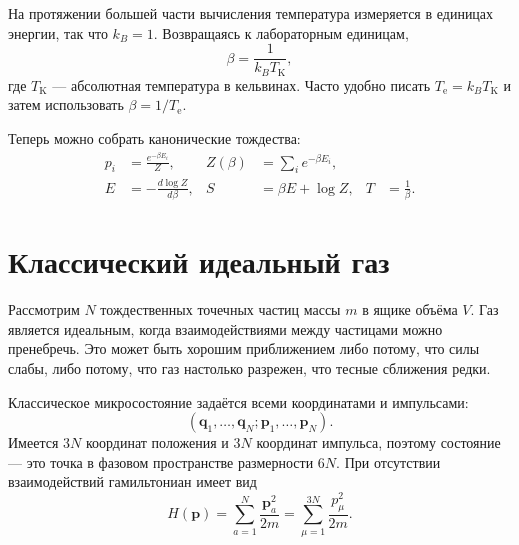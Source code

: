 На протяжении большей части вычисления температура измеряется в единицах энергии, так что \(k_B=1\). Возвращаясь к лабораторным единицам,
\begin{equation}
 \beta=\frac{1}{k_B T_{\mathrm K}},
 \label{eq:sm4-beta-laboratory}
\end{equation}
где \(T_{\mathrm K}\) — абсолютная температура в кельвинах. Часто удобно писать \(T_{\mathrm e}=k_BT_{\mathrm K}\) и затем использовать \(\beta=1/T_{\mathrm e}\).

\begin{classroomqa}
\end{classroomqa}

Теперь можно собрать канонические тождества:
\begin{align}
 p_i&=\frac{e^{-\beta E_i}}{Z},&
 Z(\beta)&=\sum_i e^{-\beta E_i},\label{eq:sm4-canonical-pair}\\
 E&=-\frac{d\log Z}{d\beta},&
 S&=\beta E+\log Z,&
 T&=\frac{1}{\beta}.
 \label{eq:sm4-canonical-identities}
\end{align}

\section{Классический идеальный газ}

Рассмотрим \(N\) тождественных точечных частиц массы \(m\) в ящике объёма \(V\). Газ является идеальным, когда взаимодействиями между частицами можно пренебречь. Это может быть хорошим приближением либо потому, что силы слабы, либо потому, что газ настолько разрежен, что тесные сближения редки.

Классическое микросостояние задаётся всеми координатами и импульсами:
\begin{equation}
 (\bm q_1,\ldots,\bm q_N;\bm p_1,\ldots,\bm p_N).
\end{equation}
Имеется \(3N\) координат положения и \(3N\) координат импульса, поэтому состояние — это точка в фазовом пространстве размерности \(6N\). При отсутствии взаимодействий гамильтониан имеет вид
\begin{equation}
 H(\bm p)=\sum_{a=1}^{N}\frac{\bm p_a^2}{2m}
 =\sum_{\mu=1}^{3N}\frac{p_\mu^2}{2m}.
 \label{eq:sm4-ideal-hamiltonian}
\end{equation}

